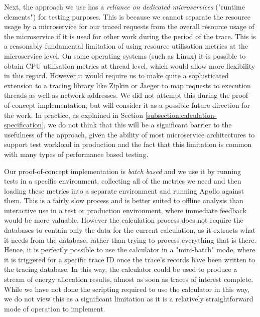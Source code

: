 Next, the approach we use has a \emph{reliance on dedicated microservices} ("runtime elements") for testing purposes.  This is because we cannot separate the resource usage by a microservice for our traced requests from the overall resource usage of the microservice if it is used for other work during the period of the trace.  This is a reasonably fundamental limitation of using resource utilisation metrics at the microservice level.  On some operating systems (such as Linux) it is possible to obtain CPU utilisation metrics at thread level, which would allow more flexibility in this regard.  However it would require us to make quite a sophisticated extension to a tracing library like Zipkin or Jaeger to map requests to execution threads as well as network addresses.  We did not attempt this during the proof-of-concept implementation, but will consider it as a possible future direction for the work.  In practice, as explained in Section \ref{subsection:calculation-specification}, we do not think that this will be a significant barrier to the usefulness of the approach, given the ability of most microservice architectures to support test workload in production and the fact that this limitation is common with many types of performance based testing.

Our proof-of-concept implementation is \emph{batch based} and we use it by running tests in a specific environment, collecting all of the metrics we need and then loading these metrics into a separate environment and running Apollo against them.  This is a fairly slow process and is better suited to offline analysis than interactive use in a test or production environment, where immediate feedback would be more valuable. However the calculation process does not require the databases to contain only the data for the current calculation, as it extracts what it needs from the database, rather than trying to process everything that is there.  Hence, it is perfectly possible to use the calculator in a "mini-batch" mode, where it is triggered for a specific trace ID once the trace's records have been written to the tracing database.  In this way, the calculator could be used to produce a stream of energy allocation results, almost as soon as traces of interest complete.  While we have not done the scripting required to use the calculator in this way, we do not view this as a significant limitation as it is a relatively straightforward mode of operation to implement.

